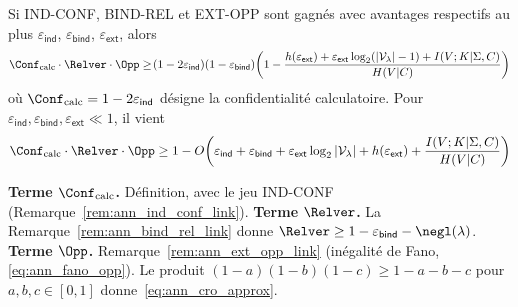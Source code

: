 \begin{sloppypar}
\begin{corollary}\label{cor:ann_cro_from_games}
Si IND-CONF, BIND-REL et EXT-OPP sont gagn\'es avec avantages respectifs au plus
$\varepsilon_{\mathsf{ind}}$, $\varepsilon_{\mathsf{bind}}$, $\varepsilon_{\mathsf{ext}}$, alors
\begin{equation}
\Conf_{\mathrm{calc}} \cdot \Relver \cdot \Opp
\geq \!\left(1-2\varepsilon_{\mathsf{ind}}\right)\!
\left(1-\varepsilon_{\mathsf{bind}}\right)\!
\left(1 - \frac{h(\varepsilon_{\mathsf{ext}})
  + \varepsilon_{\mathsf{ext}}\log_2(|\mathcal{V}_\lambda|-1)
  + I(V;K|\Sigma,C)}
  {H(V|C)}\right)
\label{eq:ann_cro_product_games}
\end{equation}
o\`u $\Conf_{\mathrm{calc}} = 1 - 2\varepsilon_{\mathsf{ind}}$ d\'esigne la confidentialit\'e
calculatoire. Pour $\varepsilon_{\mathsf{ind}},\varepsilon_{\mathsf{bind}},
\varepsilon_{\mathsf{ext}} \ll 1$, il vient
\begin{equation}
\Conf_{\mathrm{calc}} \cdot \Relver \cdot \Opp
\geq 1 - O\!\left(\varepsilon_{\mathsf{ind}}
  + \varepsilon_{\mathsf{bind}}
  + \varepsilon_{\mathsf{ext}}\log_2|\mathcal{V}_\lambda| + h(\varepsilon_{\mathsf{ext}})
  + \frac{I(V;K|\Sigma,C)}{H(V|C)}\right)
\label{eq:ann_cro_approx}
\end{equation}
\end{corollary}

\begin{Preuve}
\textbf{Terme $\Conf_{\mathrm{calc}}$.} D\'efinition, avec le jeu IND-CONF
(Remarque~\ref{rem:ann_ind_conf_link}).
\textbf{Terme $\Relver$.} La Remarque~\ref{rem:ann_bind_rel_link} donne
$\Relver \geq 1-\varepsilon_{\mathsf{bind}} - \negl(\lambda)$.
\textbf{Terme $\Opp$.} Remarque~\ref{rem:ann_ext_opp_link}
(in\'egalit\'e de Fano, \eqref{eq:ann_fano_opp}).
Le produit $(1-a)(1-b)(1-c) \geq 1-a-b-c$ pour $a,b,c \in [0,1]$
donne~\eqref{eq:ann_cro_approx}.
\end{Preuve}


\end{sloppypar}
